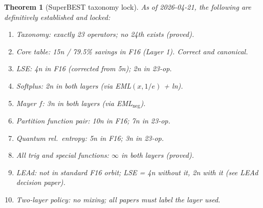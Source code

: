 \documentclass[11pt]{article}
\newtheorem{theorem}{Theorem}
\begin{document}
\begin{theorem}[SuperBEST taxonomy lock]
As of 2026-04-21, the following are definitively established and locked:
\begin{enumerate}
  \item Taxonomy: exactly 23 operators; no 24th exists (proved).
  \item Core table: 15n / 79.5\% savings in F16 (Layer 1). Correct and canonical.
  \item LSE: 4n in F16 (corrected from 5n); 2n in 23-op.
  \item Softplus: 2n in both layers (via EML$(x,1/e)$ + ln).
  \item Mayer $f$: 3n in both layers (via EML$_{\mathrm{neg}}$).
  \item Partition function pair: 10n in F16; 7n in 23-op.
  \item Quantum rel.\ entropy: 5n in F16; 3n in 23-op.
  \item All trig and special functions: $\infty$ in both layers (proved).
  \item LEAd: not in standard F16 orbit; LSE = 4n without it, 2n with it (see LEAd decision paper).
  \item Two-layer policy: no mixing; all papers must label the layer used.
\end{enumerate}
\end{theorem}
\end{document}
